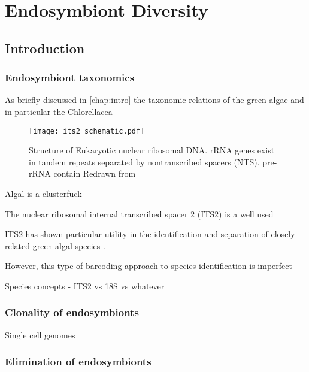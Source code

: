 % 
\graphicspath{{chapters/3.Chapter_1/figures}}

\chapter{Endosymbiont Diversity}\label{chap:endo_diversity}

\section{Introduction}

\subsection{Endosymbiont taxonomics}

As briefly discussed in \ref{chap:intro} the taxonomic relations
of the green algae and in particular the Chlorellacea 



\begin{figure}[h]
    \texttt{[image: its2\_schematic.pdf]}
    \caption{Structure of Eukaryotic nuclear ribosomal DNA.
        rRNA genes exist in tandem repeats separated by nontranscribed spacers (NTS).
        pre-rRNA contain 
    Redrawn from \citep{}}
    \label{fig;its2_schematic]}
\end{figure}



Algal is a clusterfuck

The nuclear ribosomal internal transcribed spacer 2 (ITS2) is a well used


ITS2 has shown particular utility in the identification and separation
of closely related green algal species \citep{Buchheim2011}.


However, this type of barcoding approach to species identification is 
imperfect 



Species concepts  - ITS2 vs 18S vs whatever \citep{Boenigk2012}

\subsection{Clonality of endosymbionts}

Single cell genomes






\subsection{Elimination of endosymbionts}



